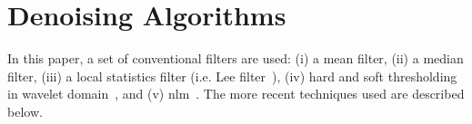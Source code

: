 \section{Denoising Algorithms} \label{sc:methodology}



In this paper, a set of conventional filters are used: (i) a mean filter, (ii) a median filter, (iii) a local statistics filter (i.e. Lee filter~\cite{4766994}), (iv) hard and soft thresholding in wavelet domain~\cite{wavelet}, and (v) \ac{nlm}~\cite{nlm}. The more recent techniques used are described below.










